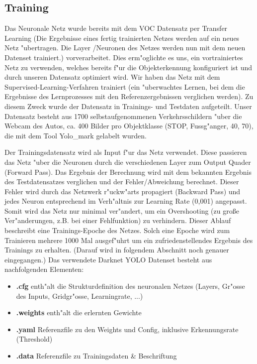 \subsection{Training}

Das Neuronale Netz wurde bereits mit dem VOC Datensatz
per Transfer Learning (Die Ergebnisse eines fertig trainierten Netzes werden auf ein neues Netz "ubertragen. Die Layer /Neuronen des Netzes werden nun mit dem neuen Datenset trainiert.) vorverarbeitet.
Dies erm"oglichte es uns, ein vortrainiertes Netz zu verwenden, welches bereits f"ur die Objekterkennung konfiguriert ist und durch unseren Datensatz optimiert wird. Wir haben das Netz mit dem Supervised-Learning-Verfahren trainiert (ein "uberwachtes Lernen, bei dem die Ergebnisse des Lernprozesses mit den Referenzergebnissen verglichen werden).  Zu diesem Zweck wurde der Datensatz in Trainings- und Testdaten aufgeteilt. Unser Datensatz besteht aus 1700 selbstaufgenommenen Verkehrsschildern "uber die Webcam des Autos, ca. 400 Bilder pro Objektklasse (STOP, Fussg"anger, 40, 70), die mit dem Tool Yolo\_mark \cite{Yolo_mark} gelabelt wurden.

Der Trainingsdatensatz wird als Input f"ur das Netz verwendet. Diese passieren das Netz "uber die Neuronen durch die verschiedenen Layer zum Output Quader (Forward Pass). Das Ergebnis der Berechnung wird mit dem bekannten Ergebnis des Testdatensatzes verglichen und der Fehler/Abweichung berechnet. Dieser Fehler wird durch das Netzwerk r"uckw"arts propagiert (Backward Pass) und jedes Neuron entsprechend im Verh"altnis zur Learning Rate (0,001) angepasst. Somit wird das Netz nur minimal ver"andert, um ein Overshooting (zu gro\ss e Ver"anderungen, z.B. bei einer Fehlfunktion) zu verhindern. Dieser Ablauf beschreibt eine Trainings-Epoche des Netzes.  Solch eine Epoche wird zum Trainieren mehrere 1000 Mal ausgef"uhrt um ein zufriedenstellendes Ergebnis des Trainings zu erhalten. (Darauf wird in folgendem Abschnitt noch genauer eingegangen.) Das verwendete Darknet YOLO Datenset besteht aus nachfolgenden Elementen:

\begin{itemize}
	\item \textbf{.cfg} enth"alt die Strukturdefinition des neuronalen Netzes (Layers, Gr"osse des Inputs, Gridgr"osse, Learningrate, ...)
	\item \textbf{.weights} enth"alt die erlernten Gewichte
	\item \textbf{.yaml} Referenzfile zu den Weights und Config, inklusive Erkennungsrate (Threshold)
	\item \textbf{.data} Referenzfile zu Trainingsdaten \& Beschriftung
\end{itemize}

